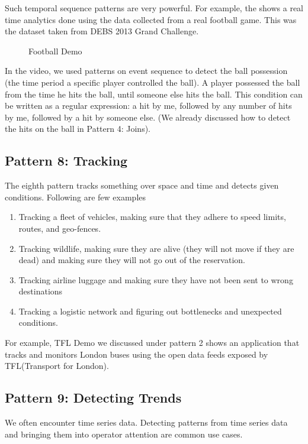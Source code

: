 \documentclass{sig-alternate}
\begin{document}
Such temporal sequence patterns are very powerful. For example, the \cite{footballDemo} shows a real time analytics done using the data collected from a real football game. This was the dataset taken from DEBS 2013 Grand Challenge. 

\begin{figure}[!htbp]
\centering
{}
\caption{Football Demo}
\label{fig:q2}
\end{figure}

In the video, we used patterns on event sequence to detect the ball possession (the time period a specific player controlled the ball). A player possessed the ball from the time he hits the ball, until someone else hits the ball. This condition can be written as a regular expression: a hit by me, followed by any number of hits by me, followed by a hit by someone else.  (We already discussed how to detect the hits on the ball in Pattern 4: Joins).  

\subsection{Pattern 8: Tracking}
The eighth pattern tracks something over space and time and detects given conditions. Following are few examples 
\begin{enumerate}
\item Tracking a fleet of vehicles, making sure that they adhere to speed limits, routes,  and geo-fences. 
\item Tracking wildlife, making sure they are alive (they will not move if they are dead) and making sure they will not go out of the reservation. 
\item Tracking airline luggage and making sure they have not been sent to wrong destinations
\item Tracking a logistic network and figuring out bottlenecks and unexpected conditions. 
\end{enumerate}

For example, TFL Demo we discussed under pattern 2 shows an application that tracks and monitors London buses using the open data feeds exposed by TFL(Transport for London). 


\subsection{Pattern 9: Detecting Trends}
We often encounter time series data. Detecting patterns from time series data and bringing them into operator attention are common use cases. 
\end{document}
